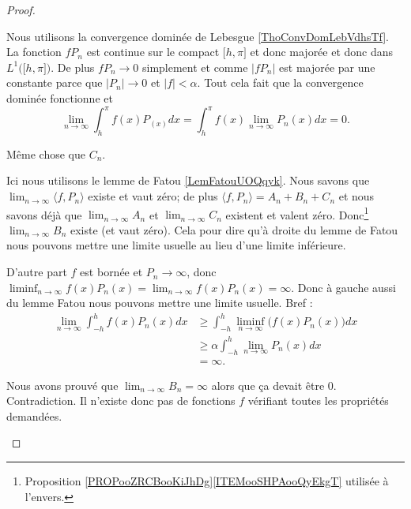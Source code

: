 \begin{proof}
\begin{subproof}
		\spitem[Calcul de \( C_n\)]
		Nous utilisons la convergence dominée de Lebesgue \ref{ThoConvDomLebVdhsTf}. La fonction \( fP_n\) est continue sur le compact \( \mathopen[ h,\pi\mathclose]\) et donc majorée et donc dans \( L^1\big( \mathopen[ h,\pi\mathclose] \big)\). De plus \( fP_n\to 0\) simplement et comme \( | fP_n |\) est majorée par une constante parce que \( | P_n |\to 0\) et \( | f |<\alpha\). Tout cela fait que la convergence dominée fonctionne et
		\begin{equation}
			\lim_{n\to \infty}\int_h^{\pi}f(x)P_(x)dx=\int_h^{\pi}f(x)\lim_{n\to \infty}P_n(x)dx=0.
		\end{equation}

		\spitem[Calcul de \( A_n\)]
		Même chose que \( C_n\).

		\spitem[Calcul de \( B_n\)]
		Ici nous utilisons le lemme de Fatou \ref{LemFatouUOQqyk}. Nous savons que \( \lim_{n\to\infty}\langle f, P_n \rangle\) existe et vaut zéro; de plus \( \langle f, P_n \rangle=A_n+B_n+C_n\) et nous savons déjà que \( \lim_{n\to \infty}A_n\) et \( \lim_{n\to\infty}C_n\) existent et valent zéro. Donc\footnote{Proposition \ref{PROPooZRCBooKiJhDg}\ref{ITEMooSHPAooQyEkgT} utilisée à l'envers.} \( \lim_{n\to \infty}B_n\) existe (et vaut zéro). Cela pour dire qu'à droite du lemme de Fatou nous pouvons mettre une limite usuelle au lieu d'une limite inférieure.

		D'autre part \( f\) est bornée et \( P_n\to \infty\), donc \( \liminf_{n\to \infty}f(x)P_n(x)=\lim_{n\to \infty}f(x)P_n(x)=\infty\). Donc à gauche aussi du lemme Fatou nous pouvons mettre une limite usuelle. Bref :
		\begin{subequations}
			\begin{align}
				\lim_{n\to \infty}\int_{-h}^hf(x)P_n(x)dx & \geq \int_{-h}^h\liminf_{n\to \infty}\big( f(x)P_n(x) \big)dx \\
				                                          & \geq \alpha\int_{-h}^h\lim_{n\to \infty}P_n(x)dx              \\
				                                          & =\infty.
			\end{align}
		\end{subequations}

		\spitem[Conclusion]
		Nous avons prouvé que \( \lim_{n\to \infty}B_n=\infty\) alors que ça devait être \( 0\). Contradiction. Il n'existe donc pas de fonctions \( f\) vérifiant toutes les propriétés demandées.
	\end{subproof}
\end{proof}


